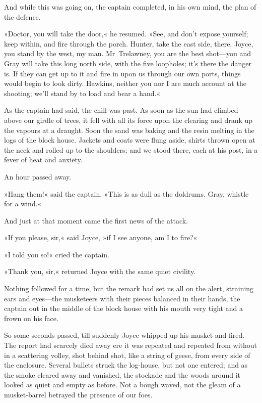 And while this was going on, the captain completed, in his own mind, the plan of the defence.

»Doctor, you will take the door,« he resumed. »See, and don't expose yourself; keep within, and fire through the porch. Hunter, take the east side, there. Joyce, you stand by the west, my man. Mr~Trelawney, you are the best shot—you and Gray will take this long north side, with the five loopholes; it's there the danger is. If they can get up to it and fire in upon us through our own ports, things would begin to look dirty. Hawkins, neither you nor I are much account at the shooting; we'll stand by to load and bear a hand.«

As the captain had said, the chill was past. As soon as the sun had climbed above our girdle of trees, it fell with all its force upon the clearing and drank up the vapours at a draught. Soon the sand was baking and the resin melting in the logs of the block house. Jackets and coats were flung aside, shirts thrown open at the neck and rolled up to the shoulders; and we stood there, each at his post, in a fever of heat and anxiety.

An hour passed away.

»Hang them!« said the captain. »This is as dull as the doldrums. Gray, whistle for a wind.«

And just at that moment came the first news of the attack.

»If you please, sir,« said Joyce, »if I see anyone, am I to fire?«

»I told you so!« cried the captain.

»Thank you, sir,« returned Joyce with the same quiet civility.

Nothing followed for a time, but the remark had set us all on the alert, straining ears and eyes—the musketeers with their pieces balanced in their hands, the captain out in the middle of the block house with his mouth very tight and a frown on his face.

So some seconds passed, till suddenly Joyce whipped up his musket and fired. The report had scarcely died away ere it was repeated and repeated from without in a scattering volley, shot behind shot, like a string of geese, from every side of the enclosure. Several bullets struck the log-house, but not one entered; and as the smoke cleared away and vanished, the stockade and the woods around it looked as quiet and empty as before. Not a bough waved, not the gleam of a musket-barrel betrayed the presence of our foes.

